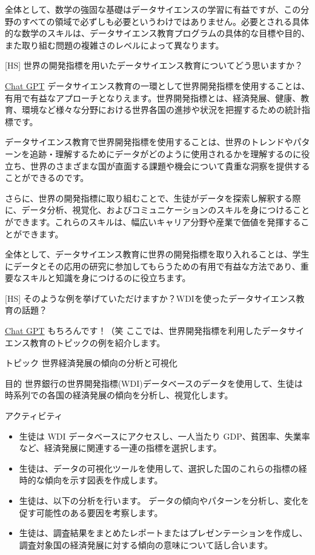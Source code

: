 \documentclass[
]{bxjsbook}
\providecommand{\tightlist}{%
  \setlength{\itemsep}{0pt}\setlength{\parskip}{0pt}}
\theoremstyle{definition}
\theoremstyle{definition}
\theoremstyle{definition}
\theoremstyle{definition}
\theoremstyle{remark}
\begin{document}
全体として、数学の強固な基礎はデータサイエンスの学習に有益ですが、この分野のすべての領域で必ずしも必要というわけではありません。必要とされる具体的な数学のスキルは、データサイエンス教育プログラムの具体的な目標や目的、また取り組む問題の複雑さのレベルによって異なります。

{[}HS{]} 世界の開発指標を用いたデータサイエンス教育についてどう思いますか？

\protect\hyperlink{chatgpt}{Chat GPT} データサイエンス教育の一環として世界開発指標を使用することは、有用で有益なアプローチとなりえます。世界開発指標とは、経済発展、健康、教育、環境など様々な分野における世界各国の進捗や状況を把握するための統計指標です。

データサイエンス教育で世界開発指標を使用することは、世界のトレンドやパターンを追跡・理解するためにデータがどのように使用されるかを理解するのに役立ち、世界のさまざまな国が直面する課題や機会について貴重な洞察を提供することができるのです。

さらに、世界の開発指標に取り組むことで、生徒がデータを探索し解釈する際に、データ分析、視覚化、およびコミュニケーションのスキルを身につけることができます。これらのスキルは、幅広いキャリア分野や産業で価値を発揮することができます。

全体として、データサイエンス教育に世界の開発指標を取り入れることは、学生にデータとその応用の研究に参加してもらうための有用で有益な方法であり、重要なスキルと知識を身につけるのに役立ちます。

{[}HS{]} そのような例を挙げていただけますか？WDIを使ったデータサイエンス教育の話題？

\protect\hyperlink{chatgpt}{Chat GPT} もちろんです！（笑 ここでは、世界開発指標を利用したデータサイエンス教育のトピックの例を紹介します。

トピック 世界経済発展の傾向の分析と可視化

目的 世界銀行の世界開発指標(WDI)データベースのデータを使用して、生徒は時系列での各国の経済発展の傾向を分析し、視覚化します。

アクティビティ

\begin{itemize}
\tightlist
\item
  生徒は WDI データベースにアクセスし、一人当たり GDP、貧困率、失業率など、経済発展に関連する一連の指標を選択します。
\item
  生徒は、データの可視化ツールを使用して、選択した国のこれらの指標の経時的な傾向を示す図表を作成します。
\item
  生徒は、以下の分析を行います。 データの傾向やパターンを分析し、変化を促す可能性のある要因を考察します。
\item
  生徒は、調査結果をまとめたレポートまたはプレゼンテーションを作成し、調査対象国の経済発展に対する傾向の意味について話し合います。
\end{itemize}
\end{document}

